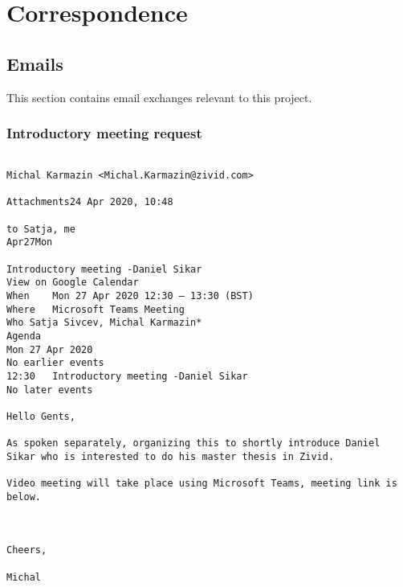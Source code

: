 \chapter{Correspondence} %

\label{Appendix-} %

\section{Emails}

This section contains email exchanges relevant to this project.

\subsection{Introductory meeting request}

\begin{verbatim}

Michal Karmazin <Michal.Karmazin@zivid.com>
	
Attachments24 Apr 2020, 10:48
	
to Satja, me
Apr27Mon
	
Introductory meeting -Daniel Sikar
View on Google Calendar
When	Mon 27 Apr 2020 12:30 – 13:30 (BST)
Where	Microsoft Teams Meeting
Who	Satja Sivcev, Michal Karmazin*
Agenda
Mon 27 Apr 2020
No earlier events
12:30	Introductory meeting -Daniel Sikar
No later events

Hello Gents,

As spoken separately, organizing this to shortly introduce Daniel Sikar who is interested to do his master thesis in Zivid.

Video meeting will take place using Microsoft Teams, meeting link is below.

 

Cheers,

Michal
\end{verbatim}

